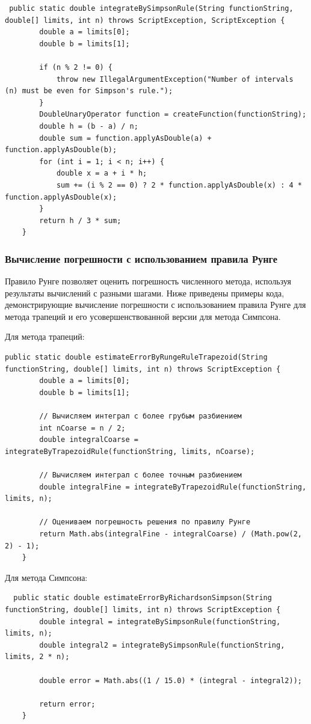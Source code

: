 \documentclass[12pt]{article}
\begin{document}
    \begin{verbatim}
 public static double integrateBySimpsonRule(String functionString, double[] limits, int n) throws ScriptException, ScriptException {
        double a = limits[0];
        double b = limits[1];

        if (n % 2 != 0) {
            throw new IllegalArgumentException("Number of intervals (n) must be even for Simpson's rule.");
        }
        DoubleUnaryOperator function = createFunction(functionString);
        double h = (b - a) / n;
        double sum = function.applyAsDouble(a) + function.applyAsDouble(b);
        for (int i = 1; i < n; i++) {
            double x = a + i * h;
            sum += (i % 2 == 0) ? 2 * function.applyAsDouble(x) : 4 * function.applyAsDouble(x);
        }
        return h / 3 * sum;
    }
    \end{verbatim}

    \subsubsection{Вычисление погрешности с использованием правила Рунге}

    Правило Рунге позволяет оценить погрешность численного метода, используя результаты вычислений с разными шагами. Ниже приведены примеры кода, демонстрирующие вычисление погрешности с использованием правила Рунге для метода трапеций и его усовершенствованной версии для метода Симпсона.

    Для метода трапеций:
    \begin{verbatim}
public static double estimateErrorByRungeRuleTrapezoid(String functionString, double[] limits, int n) throws ScriptException {
        double a = limits[0];
        double b = limits[1];

        // Вычисляем интеграл с более грубым разбиением
        int nCoarse = n / 2;
        double integralCoarse = integrateByTrapezoidRule(functionString, limits, nCoarse);

        // Вычисляем интеграл с более точным разбиением
        double integralFine = integrateByTrapezoidRule(functionString, limits, n);

        // Оцениваем погрешность решения по правилу Рунге
        return Math.abs(integralFine - integralCoarse) / (Math.pow(2, 2) - 1);
    }
    \end{verbatim}

    Для метода Симпсона:
    \begin{verbatim}
  public static double estimateErrorByRichardsonSimpson(String functionString, double[] limits, int n) throws ScriptException {
        double integral = integrateBySimpsonRule(functionString, limits, n);
        double integral2 = integrateBySimpsonRule(functionString, limits, 2 * n);

        double error = Math.abs((1 / 15.0) * (integral - integral2));

        return error;
    }
    \end{verbatim}
\end{document}
